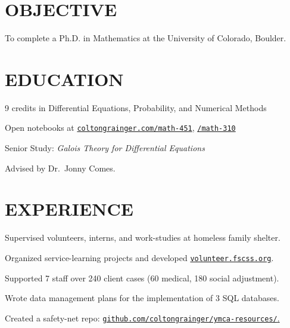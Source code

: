 \documentclass[margin]{res}
\begin{document}
\begin{resume}

\printheader
\section{OBJECTIVE}

To complete a Ph.D. in Mathematics at the University of Colorado, Boulder.

\section{EDUCATION}

\begin{details}
\item 9 credits in Differential Equations, Probability, and Numerical Methods
\item Open notebooks at \href{http://coltongrainger.com/math-451}{\texttt{coltongrainger.com/math-451}}, \href{http://coltongrainger.com/math-310}{\texttt{/math-310}}
\end{details}

\begin{details}
\item Senior Study: \emph{Galois Theory for Differential Equations}
\item Advised by Dr.~Jonny Comes.
\end{details}

\section{EXPERIENCE}

\begin{details}
\item{Supervised volunteers, interns, and work-studies at homeless family shelter.}
\item{Organized service-learning projects and developed \href{http://volunteer.fscss.org}{\texttt{volunteer.fscss.org}}.}
\end{details}

\begin{details}
\item{Supported 7 staff over 240 client cases (60 medical, 180 social adjustment).}
\item{Wrote data management plans for the implementation of 3 SQL databases.}
\item{Created a safety-net repo: \href{https://github.com/coltongrainger/ymca-resources/}{\texttt{github.com/coltongrainger/ymca-resources/}.}}
\end{details}


\end{resume}
\end{document}

